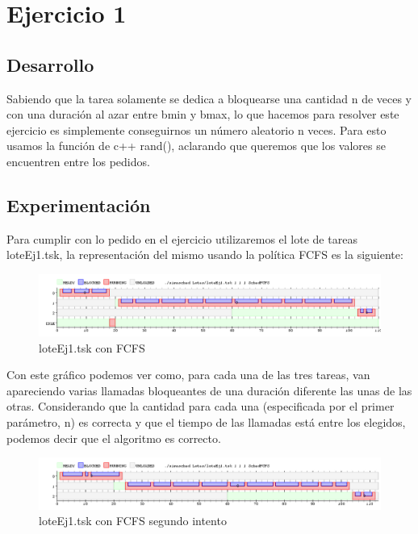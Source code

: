 
\section{Ejercicio 1}


\subsection{Desarrollo}
Sabiendo que la tarea solamente se dedica a bloquearse una cantidad n de veces y con una duración al azar entre bmin y bmax, lo que hacemos para resolver este ejercicio es 
simplemente conseguirnos un número aleatorio n veces. Para esto usamos la función de c++ rand(), aclarando que queremos que los valores se encuentren entre los pedidos.

\subsection{Experimentación}
Para cumplir con lo pedido en el ejercicio utilizaremos el lote de tareas loteEj1.tsk, la representación del mismo usando la política FCFS es la siguiente:


\begin{figure}[H]
  \centering
    \includegraphics[width=1.1\textwidth]{imagenes/Ex1Ej1.png}
  \caption{loteEj1.tsk con FCFS}
\end{figure}

Con este gráfico podemos ver como, para cada una de las tres tareas, van apareciendo varias llamadas bloqueantes de una duración diferente las unas de las otras. Considerando 
que la cantidad para cada una (especificada por el primer parámetro, n) es correcta y que el tiempo de las llamadas está entre los elegidos, podemos decir que el algoritmo es correcto.

\begin{figure}[H]
  \centering
    \includegraphics[width=1.1\textwidth]{imagenes/Ex2Ej1.png}
  \caption{loteEj1.tsk con FCFS segundo intento}
\end{figure}

